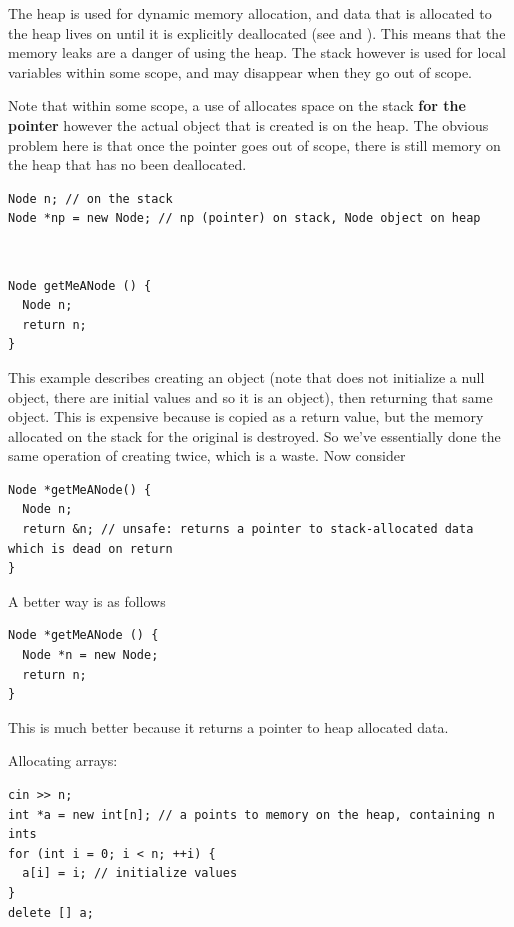 \documentclass[english, 11pt]{article}
\begin{document}
The heap is used for dynamic memory allocation, and data that is allocated to the heap lives on until it is explicitly deallocated (see  and ). This means that the memory leaks are a danger of using the heap. The stack however is used for local variables within some scope, and may disappear when they go out of scope.

\begin{exmp}
Note that within some scope, a use of  allocates space on the stack \textbf{for the pointer} however the actual object that is created is on the heap. The obvious problem here is that once the pointer goes out of scope, there is still memory on the heap that has no been deallocated.
  \begin{lstlisting}
Node n; // on the stack
Node *np = new Node; // np (pointer) on stack, Node object on heap
  \end{lstlisting}
\end{exmp}

\begin{exmp} \
\begin{lstlisting}
Node getMeANode () {
  Node n;
  return n;
}
\end{lstlisting}
This example describes creating an object (note that  does not initialize a null object, there are initial values and so it is an object), then returning that same object. This is expensive because  is copied as a return value, but the memory allocated on the stack for the original  is destroyed. So we've essentially done the same operation of creating  twice, which is a waste. Now consider
\begin{lstlisting}
Node *getMeANode() {
  Node n;
  return &n; // unsafe: returns a pointer to stack-allocated data which is dead on return
}
\end{lstlisting}
A better way is as follows
\begin{lstlisting}
Node *getMeANode () {
  Node *n = new Node;
  return n;
}
\end{lstlisting}
This is much better because it returns a pointer to heap allocated data.
\end{exmp}

\begin{exmp}Allocating arrays:
\begin{lstlisting}
cin >> n;
int *a = new int[n]; // a points to memory on the heap, containing n ints
for (int i = 0; i < n; ++i) {
  a[i] = i; // initialize values
}
delete [] a;
\end{lstlisting}
\end{exmp}
\end{document}
